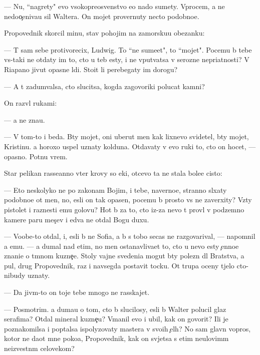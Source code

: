 \documentclass[10pt]{book}
\begin{document}
— Nu, ``nagrety" {\y}evo v{\yi}sokopreosv{\ia}{\x}enstvo {\y}e{\x}o nado sumety. Vprocem, {\y}a ne nedoo{\c}eniva{\y}u sil{\yi} Waltera. On mojet provernuty necto po\-dob\-no\-{\y}e.

Pro\-po\-ved\-nik skorcil minu, stav pohojim na zamorsku{\y}u obez{\y}anku:

— T{\yi} sam sebe protivorecix, Ludwig. To ``ne sume{\y}et", to ``mojet". Po\-ce\-mu b{\yi} tebe vs{\e}-taki ne otdaty im to, cto u teb{\ia} {\y}esty, i ne vput{\yi}vatsa v ser{\y}ozn{\yi}{\y}e nepri\-{\y}at\-nosti? V Riapano jivut opasn{\yi}{\y}e l{\io}di. Sto{\y}it li perebegaty im do\-ro\-gu?

— A t{\yi} zadum{\yi}valsa, cto slucitsa, kogda zagovor{\x}iki polucat kamni?

On razv{\e}l rukami:

— {\Y}a ne zna{\y}u.

— V tom-to i beda. B{\yi}ty mojet, oni uberut men{\ia} kak lixnevo svidetel{\ia}, b{\yi}ty mojet, Kristinu. {\Y}a horoxo uspel uznaty kolduna. Otdavaty v {\y}evo ruki to, cto on hocet, — opasno. Pot{\ia}nu vrem{\ia}.

Star{\yi}{\y} pelikan rasse{\y}anno v{\yi}ter krovy so {\x}eki, otcevo ta ne stala bole{\y}e cisto{\y}:

— Eto neskolyko ne po zakonam Boj{\y}im, i tebe, naverno{\y}e, stranno sl{\yi}xaty po\-dob\-no\-{\y}e ot men{\ia}, no, {\y}esli on tak opasen, pocemu b{\yi} prosto vs{\e} ne zaverxity? Vz{\ia}ty pistolet i raznesti {\y}emu golovu? Hot{\ia} b{\yi} za to, cto iz-za nevo t{\yi} prov{\e}l v podzemno{\y} kamere paru mes{\ia}{\c}ev i {\y}edva ne otdal Bogu duxu.

— Voob{\x}e-to otdal, i, {\y}esli b{\yi} ne Sofi{\y}a, {\y}a b{\yi} s tobo{\y} se{\y}cas ne razgovarival, — napomnil {\y}a {\y}emu. — {\Y}a dumal nad etim, no men{\ia} ostanavliva{\y}et to, cto u nevo {\y}esty {\c}enno{\y}e znani{\y}e o t{\e}mnom kuzne{\c}e. Stoly vajn{\yi}{\y}e svedeni{\y}a mogut b{\yi}ty polezn{\yi} dl{\ia} Bratstva, a pul{\ia}, drug Pro\-po\-ved\-nik, raz i navsegda postavit tocku. Ot trupa oceny t{\ia}jelo cto-nibudy uznaty.

— Da jiv{\yi}m-to on toje tebe mnogo ne rasskajet.

— Posmotrim. {\Y}a duma{\y}u o tom, cto b{\yi} slucilosy, {\y}esli b{\yi} Walter polucil glaz serafima? Otdal mineral kuzne{\c}u? V{\yi}manil {\y}evo i ubil, kak on govorit? Ili je po\-znako\-mil\-sa i pop{\yi}talsa ispolyzovaty mastera v svo{\y}ih {\c}el{\ia}h? No sam{\yi}{\y} glavn{\yi}{\y} vopros, kotor{\yi}{\y} ne da{\y}ot mne poko{\y}a, Pro\-po\-ved\-nik, kak on sv{\ia}jetsa s etim ne\-ulo\-vi\-m{\yi}m neizvestn{\yi}m celovekom?
\end{document}
